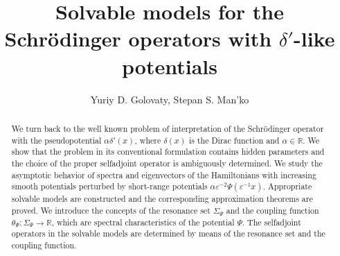 \documentclass[11pt,english]{amsart}%
\begin{document}



\newcommand{\norm}[1]{\left\Vert#1\right\Vert}
\newcommand{\abs}[1]{\left\vert#1\right\vert}









\theoremstyle{plain}
\newtheorem{g_theorem}{Theorem}[section]
\newtheorem{g_lemma}{Lemma}[section]
\newtheorem{g_definition}{Definition}[section]
\newtheorem{g_corollary}{Corollary}[section]
\newtheorem*{g_hyp}{Hypothesis}

\theoremstyle{definition}
\newtheorem{g_remark}{Remark}[section]










\title[Solvable models for the Schr\"{o}dinger operators]
{Solvable models for the Schr\"{o}dinger operators with $\delta'$-like potentials}



\author{Yuriy D. Golovaty, Stepan S. Man'ko}%
\address{ Department of Mechanics and Mathematics, Ivan Franko National University of L'viv, 1 Universytetska str., 79000 L'viv, Ukraine }




\begin{abstract}
We turn back to the well known problem of interpretation of the Schr\"{o}dinger operator with the pseudopotential $\alpha\delta'(x)$, where $\delta(x)$ is the Dirac function and $\alpha\in \mathbb{R}$. We show that the problem in its conventional formulation contains  hidden parameters and  the choice of the proper selfadjoint operator is ambiguously determined.
We study the asymptotic behavior of spectra and eigenvectors of the Hamiltonians with increa\-sing smooth potentials  perturbed by  short-range potentials  $\alpha\varepsilon^{-2}\Psi(\varepsilon^{-1}x)$. Appropriate solvable models  are constructed and the corresponding approximation theorems are proved.
We introduce the concepts of the resonance set $\Sigma_\Psi$ and the coupling function
$\theta_\Psi \colon\Sigma_\Psi \to \mathbb{R}$,
which are spectral characteristics of  the potential
$\Psi$. The selfadjoint operators in the solvable models are determined by means of the resonance set  and the coupling function.
\end{abstract}
\end{document}
